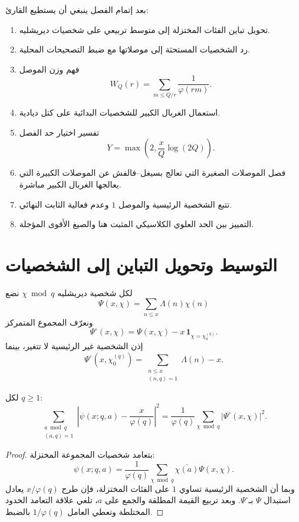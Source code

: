 بعد إتمام الفصل ينبغي أن يستطيع القارئ:
\begin{enumerate}
  \item تحويل تباين الفئات المختزلة إلى متوسط تربيعي على شخصيات ديريشليه.
  \item رد الشخصيات المستحثة إلى موصلاتها مع ضبط التصحيحات المحلية.
  \item فهم وزن الموصل
  \[
  W_Q(r)=\sum_{m\le Q/r}\frac1{\varphi(rm)}.
  \]
  \item استعمال الغربال الكبير للشخصيات البدائية على كتل ديادية.
  \item تفسير اختيار حد الفصل
  \[
  Y=\max\!\left(2,\frac{x}{Q}\log(2Q)\right).
  \]
  \item فصل الموصلات الصغيرة التي تعالج بسيغل--فالفش عن الموصلات الكبيرة
  التي يعالجها الغربال الكبير مباشرة.
  \item تتبع الشخصية الرئيسية والموصل \(1\) وعدم فعالية الثابت النهائي.
  \item التمييز بين الحد العلوي الكلاسيكي المثبت هنا والصيغ الأقوى المؤجلة.
\end{enumerate}

\section{التوسيط وتحويل التباين إلى الشخصيات}

لكل شخصية ديريشليه \(\chi\bmod q\) نضع
\[
\Psi(x,\chi)=\sum_{n\le x}\Lambda(n)\chi(n)
\]
ونعرّف المجموع المتمركز
\[
\Psi^\circ(x,\chi)
=
\Psi(x,\chi)-x\,\mathbf 1_{\chi=\chi_0^{(q)}}.
\]
إذن الشخصية غير الرئيسية لا تتغير، بينما
\[
\Psi^\circ(x,\chi_0^{(q)})
=
\sum_{\substack{n\le x\\(n,q)=1}}\Lambda(n)-x.
\]

\begin{lemma}
\label{lem:chapter14-character-variance}
\provedhere
لكل \(q\ge1\):
\[
\sum_{\substack{a\bmod q\\(a,q)=1}}
\left|\psi(x;q,a)-\frac{x}{\varphi(q)}\right|^2
=
\frac1{\varphi(q)}
\sum_{\chi\bmod q}|\Psi^\circ(x,\chi)|^2.
\tag{14.1}
\]
\end{lemma}

\begin{proof}
بتعامد شخصيات المجموعة المختزلة:
\[
\psi(x;q,a)
=
\frac1{\varphi(q)}
\sum_{\chi\bmod q}\overline{\chi(a)}\Psi(x,\chi).
\]
وبما أن الشخصية الرئيسية تساوي \(1\) على الفئات المختزلة، فإن طرح
\(x/\varphi(q)\) يعادل استبدال \(\Psi\) بـ\(\Psi^\circ\). وبعد تربيع القيمة
المطلقة والجمع على \(a\)، تلغي علاقة التعامد الحدود المختلطة وتعطي العامل
\(1/\varphi(q)\) بالضبط.
\end{proof}

